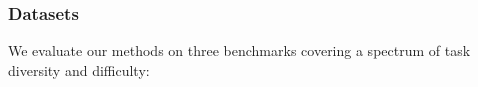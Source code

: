 \documentclass[letterpaper]{article} %
\begin{document}


\subsubsection{Datasets}
We evaluate our methods on three benchmarks covering a spectrum of task diversity and difficulty:
\end{document}
